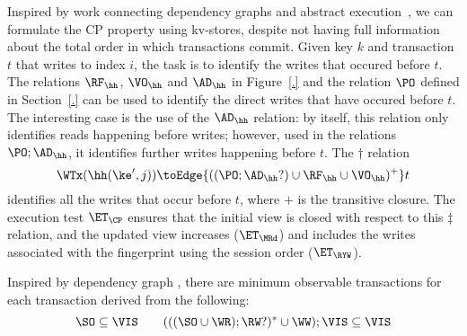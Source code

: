 
Inspired by work connecting dependency graphs and abstract execution~\cite{..}, we can formulate the CP property using kv-stores, despite not having
full information about the total order in which transactions commit.
Given key $k$ and transaction $t$ that writes to index $i$, the task
is to identify the writes that occured before $t$. The relations
$\RF_{\hh}$, $\VO_{\hh}$ and $\AD_{\hh} $ in Figure~\ref{.} and the
relation $\PO$ defined in Section~\ref{.}  can be used to identify
the direct writes that have occured before $t$. The interesting
case is the use of the $\AD_{\hh}$ relation: by itself, this relation
only identifies reads happening before writes; however, used in the
relations $\PO ;
\AD_{\hh}$, it identifies further  writes happening
before $t$. The $\dagger$ relation
\[
\WTx(\hh(\ke', j)) \toEdge{((\PO ; \AD_{\hh}? )\cup \RF_{\hh} \cup \VO_{\hh})^{+}} t
\]
identifies all the writes that occur before $t$, where $+$ is the
transitive closure. 
The execution test $\ET_{\CP}$ ensures that the initial view is 
closed with respect to this $\ddagger$  relation, and the updated view 
increases ($ \ET_\MRd $) and 
includes the writes associated with the fingerprint using the
session order ($\ET_\RYW $).





Inspired by dependency graph \cite{.....},
there are minimum observable transactions for each transaction derived from the following:
\[
    \SO  \subseteq  \VIS \qquad
    ( ( ( \SO \cup \WR ) ; \RW? )^* \cup \WW ) ; \VIS \subseteq \VIS
\]

